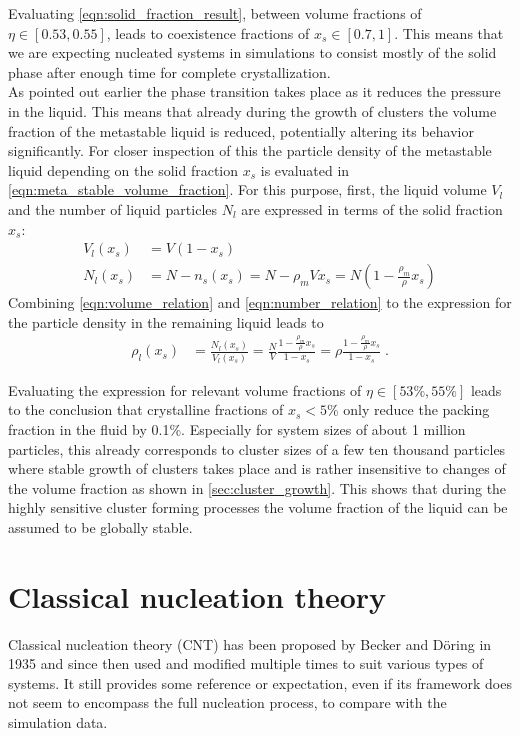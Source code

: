 Evaluating \autoref{eqn:solid_fraction_result}, between volume fractions of $\eta \in [0.53,0.55]$, leads to coexistence fractions of $x_s \in [0.7,1]$. This means that we are expecting nucleated systems in simulations to consist mostly of the solid phase after enough time for complete crystallization.\\

As pointed out earlier the phase transition takes place as it reduces the pressure in the liquid. This means that already during the growth of clusters the volume fraction of the metastable liquid is reduced, potentially altering its behavior significantly. For closer inspection of this the particle density of the metastable liquid depending on the solid fraction $x_s$ is evaluated in \autoref{eqn:meta_stable_volume_fraction}. For this purpose, first, the liquid volume $V_l$ and the number of liquid particles $N_l$ are expressed in terms of the solid fraction $x_s$:
\begin{align}
\label{eqn:volume_relation}
V_l(x_s) & = V(1-x_s)\\
\label{eqn:number_relation}
N_l(x_s) & = N-n_s(x_s) = N - \rho_m V x_s = N(1-\frac{\rho_m}{\rho}x_s)
\end{align}
Combining \autoref{eqn:volume_relation} and \autoref{eqn:number_relation} to the expression for the particle density in the remaining liquid leads to
\begin{align}
\label{eqn:meta_stable_volume_fraction}
\rho_l(x_s) &= \frac{N_l (x_s) }{ V_l(x_s) } = \frac{N}{V} \frac{1-\frac{\rho_m}{\rho}x_s}{1-x_s} = \rho \frac{1-\frac{\rho_m}{\rho}x_s}{1-x_s} \; \text{.}
\end{align}
 
Evaluating the expression for relevant volume fractions of $\eta \in [53\%, 55\%]$ leads to the conclusion that crystalline fractions of $x_s < 5\%$ only reduce the packing fraction in the fluid by 0.1\%. Especially for system sizes of about 1 million particles, this already corresponds to cluster sizes of a few ten thousand particles where stable growth of clusters takes place and is rather insensitive to changes of the volume fraction as shown in \autoref{sec:cluster_growth}. This shows that during the highly sensitive cluster forming processes the volume fraction of the liquid can be assumed to be globally stable.

\section{Classical nucleation theory }
\label{sec:CNT}
Classical nucleation theory (CNT) has been proposed by Becker and Döring in 1935\cite{Becker1935} and since then used and modified multiple times to suit various types of systems. It still provides some reference or expectation, even if its framework does not seem to encompass the full nucleation process, to compare with the simulation data.\\

